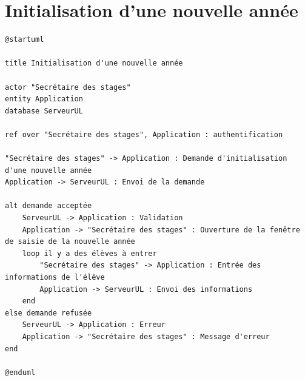 \documentclass[11pt, a4paper]{report}
\begin{document}
\section*{Initialisation d'une nouvelle année}
\begin{verbatim}
@startuml

title Initialisation d'une nouvelle année

actor "Secrétaire des stages"
entity Application
database ServeurUL

ref over "Secrétaire des stages", Application : authentification

"Secrétaire des stages" -> Application : Demande d'initialisation d'une nouvelle année
Application -> ServeurUL : Envoi de la demande 

alt demande acceptée
	ServeurUL -> Application : Validation
	Application -> "Secrétaire des stages" : Ouverture de la fenêtre de saisie de la nouvelle année
	loop il y a des élèves à entrer
		"Secrétaire des stages" -> Application : Entrée des informations de l'élève
		Application -> ServeurUL : Envoi des informations
	end
else demande refusée
	ServeurUL -> Application : Erreur
	Application -> "Secrétaire des stages" : Message d'erreur
end

@enduml
\end{verbatim}
\end{document}
